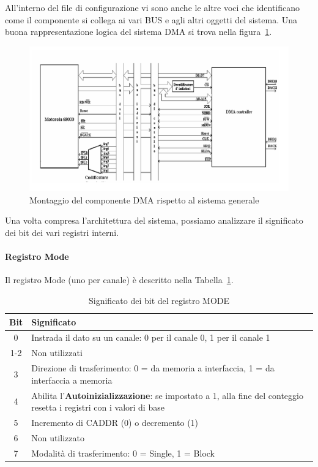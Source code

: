 All'interno del file di configurazione vi sono anche le altre voci che identificano come il componente si collega ai vari BUS e agli altri oggetti del sistema. Una buona rappresentazione logica del sistema DMA si trova nella figura~\ref{img:architettura-dma}.

\begin{figure}[ht]
    \centering
    \includegraphics[width=.7\textwidth]{img/architettura-dma.png}
    \caption{Montaggio del componente DMA rispetto al sistema generale}
    \label{img:architettura-dma}
\end{figure}

Una volta compresa l'architettura del sistema, possiamo analizzare il significato dei bit dei vari registri interni.

\paragraph{Registro Mode}
Il registro Mode (uno per canale) è descritto nella Tabella~\ref{tab:MODE-8237}.
\begin{table}[ht]
    \centering
    \begin{tabular}{|c|p{11cm}|}
    \hline
    \textbf{Bit} & \textbf{Significato} \\ \hline
    0 & Instrada il dato su un canale: 0 per il canale 0, 1 per il canale 1 \\ \hline
    1-2 & Non utilizzati \\ \hline
    3 & Direzione di trasferimento: 0 = da memoria a interfaccia, 1 = da interfaccia a memoria \\ \hline
    4 & Abilita l'\textbf{Autoinizializzazione}: se impostato a 1, alla fine del conteggio resetta i registri con i valori di base \\ \hline
    5 & Incremento di CADDR (0) o decremento (1) \\ \hline
    6 & Non utilizzato \\ \hline
    7 & Modalità di trasferimento: 0 = Single, 1 = Block \\ \hline
    \end{tabular}
    \caption{Significato dei bit del registro MODE}
    \label{tab:MODE-8237}
\end{table}

